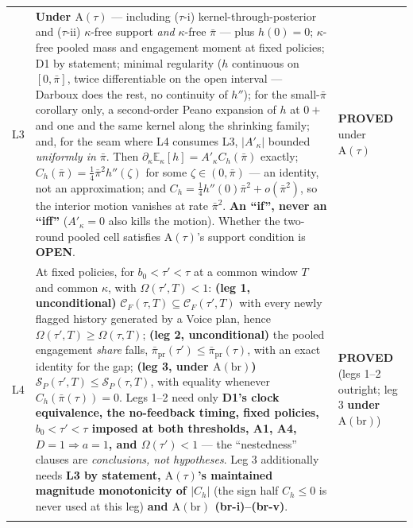 \documentclass[11pt,a4paper]{article}
\newcommand{\Eop}{\mathbb{E}}
\newcommand{\Atau}{\mathrm{A}(\tau)}
\newcommand{\Abr}{\mathrm{A}(\mathrm{br})}
\newcommand{\Akap}{A'_{\kappa}}
\begin{document}
\begin{longtable}{@{}p{}>{\raggedright\arraybackslash}p{}>{\raggedright\arraybackslash}p{}@{}}
L3 &
\textbf{Under $\Atau$} --- including ($\tau$-i) kernel-through-posterior and
($\tau$-ii) $\kappa$-free support \emph{and} $\kappa$-free $\bar\pi$ --- plus
$h(0)=0$; $\kappa$-free pooled mass and engagement moment at fixed policies; D1 by
statement; minimal regularity ($h$ continuous on $[0,\bar\pi]$, twice differentiable
on the open interval --- Darboux does the rest, no continuity of $h''$); for the
small-$\bar\pi$ corollary only, a second-order Peano expansion of $h$ at $0+$ and one
and the same kernel along the shrinking family; and, for the seam where L4 consumes
L3, $|\Akap|$ bounded \emph{uniformly in $\bar\pi$}. Then
$\partial_\kappa\Eop_\kappa[h]=\Akap C_h(\bar\pi)$ exactly;
$C_h(\bar\pi)=\tfrac14\bar\pi^2h''(\zeta)$ for some $\zeta\in(0,\bar\pi)$ --- an
identity, not an approximation; and
$C_h=\tfrac14h''(0)\bar\pi^2+o(\bar\pi^2)$, so the interior motion vanishes at rate
$\bar\pi^2$. \textbf{An ``if'', never an ``iff''} ($\Akap=0$ also kills the motion).
Whether the two-round pooled cell satisfies $\Atau$'s support condition is
\textbf{OPEN}. &
\textbf{PROVED} under $\Atau$ \\
\addlinespace

L4 &
At fixed policies, for $b_0<\tau'<\tau$ at a common window $T$ and common $\kappa$,
with $\Omega(\tau',T)<1$: \textbf{(leg 1, unconditional)}
$\mathcal C_F(\tau,T)\subseteq\mathcal C_F(\tau',T)$ with every newly flagged history
generated by a Voice plan, hence $\Omega(\tau',T)\ge\Omega(\tau,T)$;
\textbf{(leg 2, unconditional)} the pooled engagement \emph{share} falls,
$\bar\pi_{\mathrm{pr}}(\tau')\le\bar\pi_{\mathrm{pr}}(\tau)$, with an exact identity
for the gap; \textbf{(leg 3, under $\Abr$)}
$\mathcal S_P(\tau',T)\le\mathcal S_P(\tau,T)$, with equality whenever
$C_h(\bar\pi(\tau))=0$. Legs 1--2 need only \textbf{D1's clock equivalence, the
no-feedback timing, fixed policies, $b_0<\tau'<\tau$ imposed at both thresholds, A1,
A4, $D=1\Rightarrow a=1$, and $\Omega(\tau')<1$} --- the ``nestedness'' clauses are
\emph{conclusions, not hypotheses}. Leg 3 additionally needs \textbf{L3 by statement,
$\Atau$'s maintained magnitude monotonicity of $|C_h|$} (the sign half $C_h\le0$ is
never used at this leg) \textbf{and $\Abr$ (br-i)--(br-v)}. &
\textbf{PROVED} (legs 1--2 outright; leg 3 \textbf{under $\Abr$}) \\
\addlinespace


\end{longtable}
\end{document}
